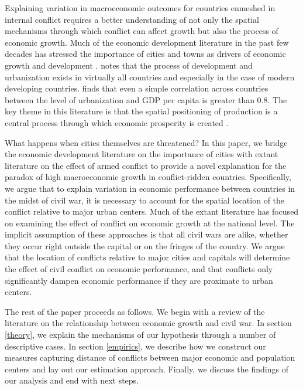 Explaining variation in macroeconomic outcomes for countries enmeshed in internal conflict requires a better understanding of not only the spatial mechanisms through which conflict can affect growth but also the process of economic growth. Much of the economic development literature in the past few decades has stressed the importance of cities and towns as drivers of economic growth and development \citep{hanson:2005}. \citet{venables:2005} notes that the process of development and urbanization exists in virtually all countries and especially in the case of modern developing countries. \citet{henderson:2000} finds that even a simple correlation across countries between the level of urbanization and GDP per capita is greater than 0.8. The key theme in this literature is that the spatial positioning of production is a central process through which economic prosperity is created \citep{krugman:1991}.


What happens when cities themselves are threatened? In this paper, we bridge the economic development literature on the importance of cities with extant literature on the effect of armed conflict to provide a novel explanation for the paradox of high macroeconomic growth in conflict-ridden countries. Specifically, we argue that to explain variation in economic performance between countries in the midst of civil war, it is necessary to account for the spatial location of the conflict relative to major urban centers. Much of the extant literature has focused on examining the effect of conflict on economic growth at the national level. The implicit assumption of these approaches is that all civil wars are alike, whether they occur right outside the capital or on the fringes of the country. We argue that the location of conflicts relative to major cities and capitals will determine the effect of civil conflict on economic performance, and that conflicts only significantly dampen economic performance if they are proximate to urban centers. 

The rest of the paper proceeds as follows.  We begin with a review of the literature on the relationship between economic growth and civil war. In section \ref{theory}, we explain the mechanisms of our hypothesis through a number of descriptive cases. In section \ref{empirics}, we describe how we construct our measures capturing distance of conflicts between major economic and population centers and lay out our estimation approach. Finally, we discuss the findings of our analysis and end with next steps. 
